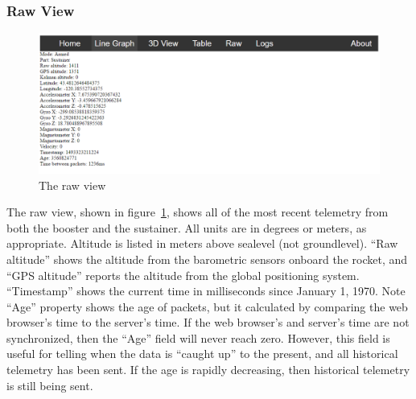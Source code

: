 \documentclass[10pt,draftclsnofoot,onecolumn]{IEEEtran}
\begin{document}
\subsubsection{Raw View}
	\begin{figure}[thbp!]
		\centering\includegraphics[width=170mm]{gs-raw}
		\caption{The raw view}
		\label{gs-raw}
	\end{figure}
The raw view, shown in figure~\ref{gs-raw}, shows all of the most recent telemetry from both the
booster and the sustainer. All units are in degrees or meters, as appropriate.
Altitude is listed in meters above sealevel (not groundlevel).
``Raw altitude'' shows the altitude from the barometric sensors onboard the rocket,
and ``GPS altitude'' reports the altitude from the global positioning system.
``Timestamp'' shows the current time in milliseconds since January 1, 1970.
Note ``Age'' property shows the age of packets, but it calculated by comparing the
web browser's time to the server's time.
If the web browser's and server's time are not synchronized, then the ``Age'' field will
never reach zero.
However, this field is useful for telling when the data is ``caught up'' to the present,
and all historical telemetry has been sent.
If the age is rapidly decreasing, then historical telemetry is still being sent.
\end{document}
